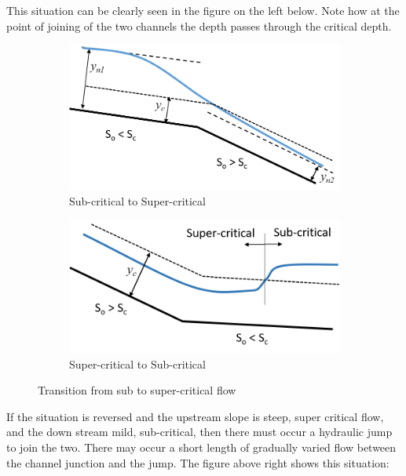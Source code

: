 \documentclass[a4paper, 12pt, british]{article} %
\numberwithin{equation}{section}
\numberwithin{figure}{section}
\numberwithin{table}{section}
\begin{document}
This situation can be clearly seen in the figure on the left below. Note how at the point of joining of the two channels the depth passes through the critical depth.
\begin{figure}[H]
  \centering
  \begin{subfigure}[b]{0.4\textwidth}
	\includegraphics[width=\textwidth]{./images/transition_sub_super.png}
	\caption{Sub-critical to Super-critical}
	\label{fig:1131b}
  \end{subfigure}
%
  \begin{subfigure}[b]{0.4\textwidth}
	\includegraphics[width=\textwidth]{./images/transition_super_sub.png}
	\caption{Super-critical to Sub-critical}
	\label{fig:1131c}
  \end{subfigure}
  \caption{Transition from sub to super-critical flow}
  \label{fig:1131}
\end{figure}  
If the situation is reversed and the upstream slope is steep, super critical flow, and the down stream mild, sub-critical, then there must occur a hydraulic jump to join the two. There may occur a short length of gradually varied flow between the channel junction and the jump. The figure above right shows this situation:
\end{document}
